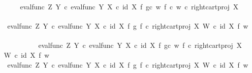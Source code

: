 \begin{isabellebody}
\ \isamarkupfalse%
\ {\isachardoublequoteopen}{\isachardot}{\kern0pt}{\isachardot}{\kern0pt}{\isachardot}{\kern0pt}\ {\isacharequal}{\kern0pt}\ {\isacharparenleft}{\kern0pt}eval{\isacharunderscore}{\kern0pt}func\ Z\ Y\ {\isasymcirc}\isactrlsub c\ {\isasymlangle}eval{\isacharunderscore}{\kern0pt}func\ Y\ X\ {\isasymcirc}\isactrlsub c\ {\isacharparenleft}{\kern0pt}id\ X\ {\isasymtimes}\isactrlsub f\ {\isacharparenleft}{\kern0pt}g{\isasymcirc}\isactrlsub c\ w{\isacharparenright}{\kern0pt}{\isacharparenright}{\kern0pt}{\isacharcomma}{\kern0pt}\ {\isacharparenleft}{\kern0pt}f\ {\isasymcirc}\isactrlsub c\ w{\isacharparenright}{\kern0pt}\ {\isasymcirc}\isactrlsub c\ right{\isacharunderscore}{\kern0pt}cart{\isacharunderscore}{\kern0pt}proj\ X\ {\isasymone}{\isasymrangle}{\isacharparenright}{\kern0pt}\isactrlsup {\isasymsharp}{\isachardoublequoteclose}\isanewline
\ \ \isamarkupfalse%
\ {\isacharminus}{\kern0pt}\ \isanewline
\ \ \ \ \isamarkupfalse%
\ {\isachardoublequoteopen}{\isacharparenleft}{\kern0pt}eval{\isacharunderscore}{\kern0pt}func\ Z\ Y\ {\isasymcirc}\isactrlsub c\ {\isasymlangle}eval{\isacharunderscore}{\kern0pt}func\ Y\ X\ {\isasymcirc}\isactrlsub c\ {\isacharparenleft}{\kern0pt}id\ X\ {\isasymtimes}\isactrlsub f\ g{\isacharparenright}{\kern0pt}{\isacharcomma}{\kern0pt}\ f\ {\isasymcirc}\isactrlsub c\ right{\isacharunderscore}{\kern0pt}cart{\isacharunderscore}{\kern0pt}proj\ X\ W{\isasymrangle}{\isacharparenright}{\kern0pt}\isactrlsup {\isasymsharp}\isactrlsup {\isasymflat}\ {\isasymcirc}\isactrlsub c\ {\isacharparenleft}{\kern0pt}id\ X\ {\isasymtimes}\isactrlsub f\ w{\isacharparenright}{\kern0pt}\ {\isacharequal}{\kern0pt}\ \isanewline
\ \ \ \ \ \ \ \ \ \ eval{\isacharunderscore}{\kern0pt}func\ Z\ Y\ {\isasymcirc}\isactrlsub c\ {\isasymlangle}eval{\isacharunderscore}{\kern0pt}func\ Y\ X\ {\isasymcirc}\isactrlsub c\ {\isacharparenleft}{\kern0pt}id\ X\ {\isasymtimes}\isactrlsub f\ {\isacharparenleft}{\kern0pt}g{\isasymcirc}\isactrlsub c\ w{\isacharparenright}{\kern0pt}{\isacharparenright}{\kern0pt}{\isacharcomma}{\kern0pt}\ f\ {\isasymcirc}\isactrlsub c\ right{\isacharunderscore}{\kern0pt}cart{\isacharunderscore}{\kern0pt}proj\ X\ W\ {\isasymcirc}\isactrlsub c\ {\isacharparenleft}{\kern0pt}id\ X\ {\isasymtimes}\isactrlsub f\ w{\isacharparenright}{\kern0pt}{\isasymrangle}{\isachardoublequoteclose}\isanewline
\ \ \ \ \isamarkupfalse%
\ {\isacharminus}{\kern0pt}\ \isanewline
\ \ \ \ \ \ \isamarkupfalse%
\ {\isachardoublequoteopen}eval{\isacharunderscore}{\kern0pt}func\ Z\ Y\ {\isasymcirc}\isactrlsub c\ {\isasymlangle}eval{\isacharunderscore}{\kern0pt}func\ Y\ X\ {\isasymcirc}\isactrlsub c\ {\isacharparenleft}{\kern0pt}id\ X\ {\isasymtimes}\isactrlsub f\ g{\isacharparenright}{\kern0pt}{\isacharcomma}{\kern0pt}\ f\ {\isasymcirc}\isactrlsub c\ right{\isacharunderscore}{\kern0pt}cart{\isacharunderscore}{\kern0pt}proj\ X\ W{\isasymrangle}\ {\isasymcirc}\isactrlsub c\ {\isacharparenleft}{\kern0pt}id\ X\ {\isasymtimes}\isactrlsub f\ w{\isacharparenright}{\kern0pt}\ \isanewline

\end{isabellebody}
